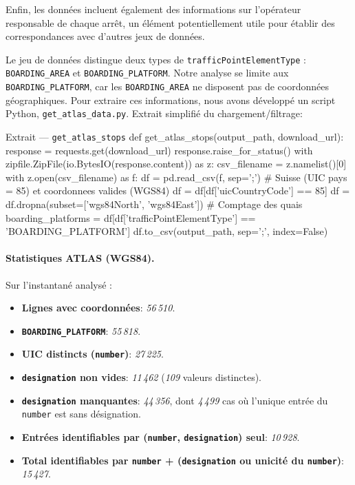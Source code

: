 Enfin, les données incluent également des informations sur l’opérateur responsable de chaque arrêt, un élément potentiellement utile pour établir des correspondances avec d’autres jeux de données.

Le jeu de données distingue deux types de \texttt{trafficPointElementType} : \texttt{BOARDING\_AREA} et \texttt{BOARDING\_PLATFORM}. Notre analyse se limite aux \texttt{BOARDING\_PLATFORM}, car les \texttt{BOARDING\_AREA} ne disposent pas de coordonnées géographiques. Pour extraire ces informations, nous avons développé un script Python, \texttt{get\_atlas\_data.py}. Extrait simplifié du chargement/filtrage:

\begin{codebox}[language=Python]{Extrait — \texttt{get\_atlas\_stops}}
def get_atlas_stops(output_path, download_url):
    response = requests.get(download_url)
    response.raise_for_status()
    with zipfile.ZipFile(io.BytesIO(response.content)) as z:
        csv_filename = z.namelist()[0]
        with z.open(csv_filename) as f:
            df = pd.read_csv(f, sep=';')
            # Suisse (UIC pays = 85) et coordonnees valides (WGS84)
            df = df[df['uicCountryCode'] == 85]
            df = df.dropna(subset=['wgs84North', 'wgs84East'])
            # Comptage des quais
            boarding_platforms = df[df['trafficPointElementType'] == 'BOARDING_PLATFORM']
            df.to_csv(output_path, sep=';', index=False)
\end{codebox}



\paragraph{Statistiques ATLAS (WGS84).} Sur l’instantané analysé :
\begin{itemize}
  \item \textbf{Lignes avec coordonnées}: \textit{56\,510}.
  \item \textbf{\texttt{BOARDING\_PLATFORM}}: \textit{55\,818}.
  \item \textbf{UIC distincts (\texttt{number})}: \textit{27\,225}.
  \item \textbf{\texttt{designation} non vides}: \textit{11\,462} (\textit{109} valeurs distinctes).
  \item \textbf{\texttt{designation} manquantes}: \textit{44\,356}, dont \textit{4\,499} cas où l’unique entrée du \texttt{number} est sans désignation.
  \item \textbf{Entrées identifiables par (\texttt{number}, \texttt{designation}) seul}: \textit{10\,928}.
  \item \textbf{Total identifiables par \texttt{number} + (\texttt{designation} ou unicité du \texttt{number})}: \textit{15\,427}.
\end{itemize}

